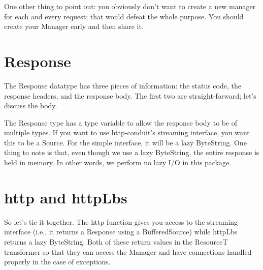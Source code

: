 One other thing to point out: you obviously don't want to create a new
manager for each and every request; that would defeat the whole
purpose. You should create your Manager early and then share it.

\section{Response}

The Response datatype has three pieces of information: the status
code, the response headers, and the response body. The first two are
straight-forward; let's discuss the body.

The Response type has a type variable to allow the response body to be
of multiple types. If you want to use http-conduit's streaming
interface, you want this to be a Source. For the simple interface, it
will be a lazy ByteString. One thing to note is that, even though we
use a lazy ByteString, the entire response is held in memory. In other
words, we perform no lazy I/O in this package.


\section{http and httpLbs}

So let's tie it together. The http function gives you access to the
streaming interface (i.e., it returns a Response using a
BufferedSource) while httpLbs returns a lazy ByteString. Both of these
return values in the ResourceT transformer so that they can access the
Manager and have connections handled properly in the case of
exceptions.


